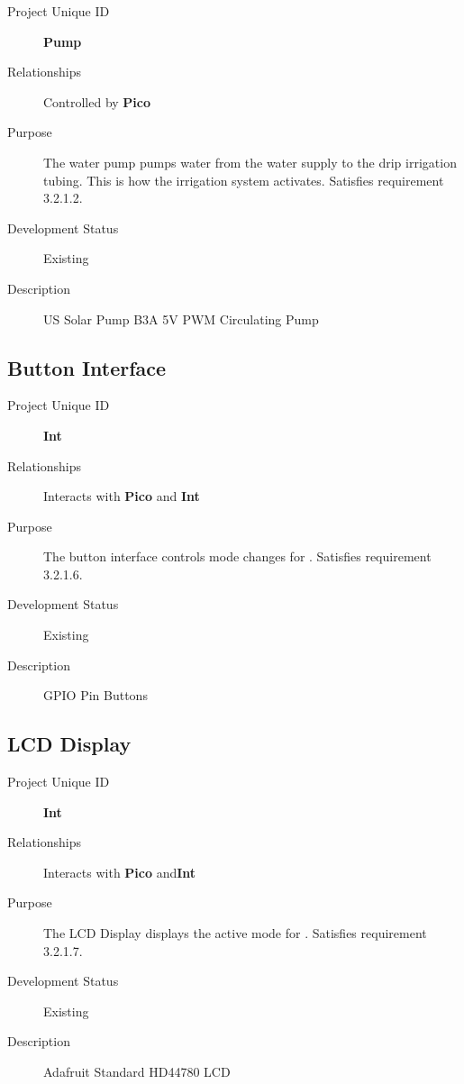 \begin{description}
    \item[Project Unique ID] \textbf{Pump}
    \item[Relationships] Controlled by \textbf{Pico}
    \item[Purpose] The water pump pumps water from the water supply to the drip irrigation tubing. This is how the irrigation system activates. Satisfies requirement 3.2.1.2.
    \item[Development Status] Existing
    \item[Description] US Solar Pump B3A 5V PWM Circulating Pump
\end{description}

\subsection{Button Interface}

\begin{description}
    \item[Project Unique ID] \textbf{Int}
    \item[Relationships] Interacts with \textbf{Pico} and \textbf{Int}
    \item[Purpose] The button interface controls mode changes for \ThisSys. Satisfies requirement 3.2.1.6.
    \item[Development Status] Existing
    \item[Description] GPIO Pin Buttons
\end{description}

\subsection{LCD Display}

\begin{description}
    \item[Project Unique ID] \textbf{Int}
    \item[Relationships] Interacts with \textbf{Pico} and\textbf{Int}
    \item[Purpose] The LCD Display displays the active mode for \thisSys. Satisfies requirement 3.2.1.7.
    \item[Development Status] Existing
    \item[Description] Adafruit Standard HD44780 LCD
\end{description}

